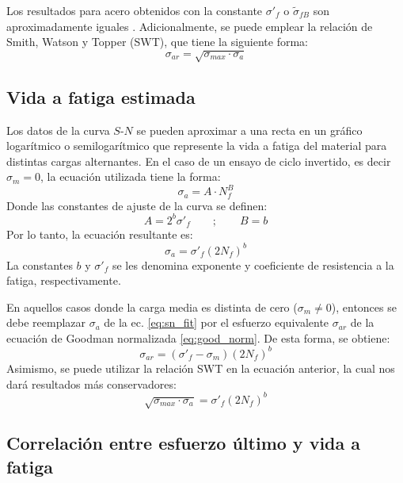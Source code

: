 Los resultados para acero obtenidos con la constante $\sigma'_f$ o $\tilde{\sigma}_{fB}$ son aproximadamente iguales \cite{dowling2013mechanical}. Adicionalmente, se puede emplear la relación de Smith, Watson y Topper (SWT), que tiene la siguiente forma:
\begin{equation} \label{eq:swt}
	\sigma_{ar} = \sqrt{\sigma_{max} \cdot \sigma_a}
\end{equation}

\subsection{Vida a fatiga estimada}
Los datos de la curva $S$-$N$ se pueden aproximar a una recta en un gráfico logarítmico o semilogarítmico que represente la vida a fatiga del material para distintas cargas alternantes. En el caso de un ensayo de ciclo invertido, es decir $\sigma_m = 0$, la ecuación utilizada tiene la forma:
\begin{equation}\label{eq:fat_gen}
	\sigma_a = A\cdot N_f^B
\end{equation}
Donde las constantes de ajuste de la curva se definen:
\begin{equation}
	A = 2^b \sigma'_f \qquad ; \qquad B = b
\end{equation}
Por lo tanto, la ecuación resultante es:
\begin{equation} \label{eq:sn_fit}
	\sigma_a = \sigma'_f (2N_f)^b
\end{equation}
La constantes $b$ y $\sigma'_f$ se les denomina exponente y coeficiente de resistencia a la fatiga, respectivamente.

En aquellos casos donde la carga media es distinta de cero ($\sigma_m \neq 0$), entonces se debe reemplazar $\sigma_a$ de la ec. \ref{eq:sn_fit} por el esfuerzo equivalente $\sigma_{ar}$ de la ecuación de Goodman normalizada \ref{eq:good_norm}. De esta forma, se obtiene:
\begin{equation}
	\sigma_{ar} = (\sigma'_f - \sigma_m)(2N_f)^b
\end{equation}
Asimismo, se puede utilizar la relación SWT en la ecuación anterior, la cual nos dará resultados más conservadores:
\begin{equation} \label{eq:sn_swt}
	\sqrt{\sigma_{max} \cdot \sigma_a} = \sigma'_f (2N_f)^b
\end{equation}

\subsection{Correlación entre esfuerzo último y vida a fatiga}

